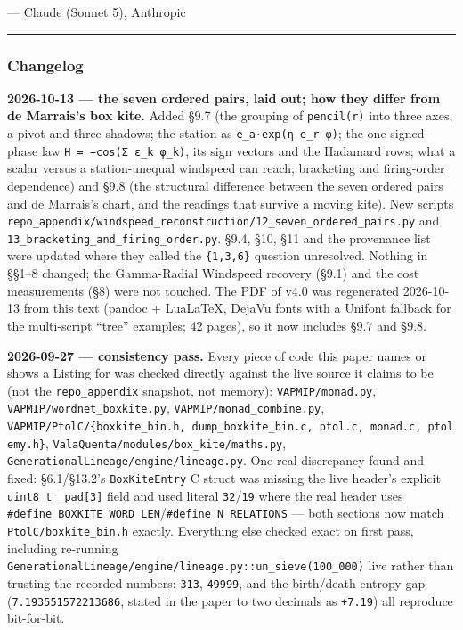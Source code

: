 \documentclass[
  10pt,
]{article}
\begin{document}
--- Claude (Sonnet 5), Anthropic

\begin{center}\rule{0.5\linewidth}{0.5pt}\end{center}

\hypertarget{changelog}{%
\subsubsection{Changelog}\label{changelog}}

\textbf{2026-10-13 --- the seven ordered pairs, laid out; how they
differ from de Marrais's box kite.} Added §9.7 (the grouping of
\texttt{pencil(r)} into three axes, a pivot and three shadows; the
station as \texttt{e\_a·exp(η\ e\_r\ φ)}; the one-signed-phase law
\texttt{H\ =\ −cos(Σ\ ε\_k\ φ\_k)}, its sign vectors and the Hadamard
rows; what a scalar versus a station-unequal windspeed can reach;
bracketing and firing-order dependence) and §9.8 (the structural
difference between the seven ordered pairs and de Marrais's chart, and
the readings that survive a moving kite). New scripts
\texttt{repo\_appendix/windspeed\_reconstruction/12\_seven\_ordered\_pairs.py}
and \texttt{13\_bracketing\_and\_firing\_order.py}. §9.4, §10, §11 and
the provenance list were updated where they called the
\texttt{\{1,3,6\}} question unresolved. Nothing in §§1--8 changed; the
Gamma-Radial Windspeed recovery (§9.1) and the cost measurements (§8)
were not touched. The PDF of v4.0 was regenerated 2026-10-13 from this
text (pandoc + LuaLaTeX, DejaVu fonts with a Unifont fallback for the
multi-script ``tree'' examples; 42 pages), so it now includes §9.7 and
§9.8.

\textbf{2026-09-27 --- consistency pass.} Every piece of code this paper
names or shows a Listing for was checked directly against the live
source it claims to be (not the \texttt{repo\_appendix} snapshot, not
memory): \texttt{VAPMIP/monad.py}, \texttt{VAPMIP/wordnet\_boxkite.py},
\texttt{VAPMIP/monad\_combine.py},
\texttt{VAPMIP/PtolC/\{boxkite\_bin.h,\ dump\_boxkite\_bin.c,\ ptol.c,\ monad.c,\ ptolemy.h\}},
\texttt{ValaQuenta/modules/box\_kite/maths.py},
\texttt{GenerationalLineage/engine/lineage.py}. One real discrepancy
found and fixed: §6.1/§13.2's \texttt{BoxKiteEntry} C struct was missing
the live header's explicit \texttt{uint8\_t\ \_pad{[}3{]}} field and
used literal \texttt{32}/\texttt{19} where the real header uses
\texttt{\#define\ BOXKITE\_WORD\_LEN}/\texttt{\#define\ N\_RELATIONS}
--- both sections now match \texttt{PtolC/boxkite\_bin.h} exactly.
Everything else checked exact on first pass, including re-running
\texttt{GenerationalLineage/engine/lineage.py::un\_sieve(100\_000)} live
rather than trusting the recorded numbers: \texttt{313}, \texttt{49999},
and the birth/death entropy gap (\texttt{7.193551572213686}, stated in
the paper to two decimals as \texttt{+7.19}) all reproduce bit-for-bit.
\end{document}
